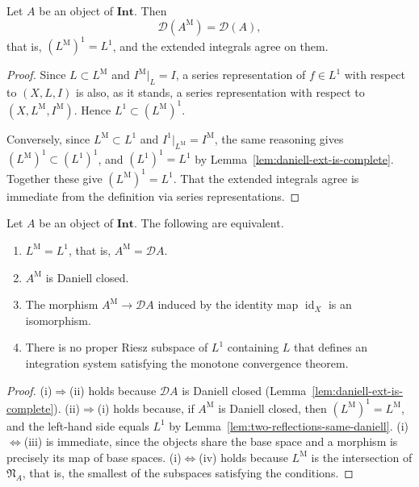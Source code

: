 \begin{lemma}\label{lem:two-reflections-same-daniell}
  Let $A$ be an object of $\mathbf{Int}$. Then
  \[
    \mathcal{D}(A^{\mathrm{M}})=\mathcal{D}(A),
  \]
  that is, $(L^{\mathrm{M}})^1=L^1$, and the extended integrals agree on them.
\end{lemma}
\begin{proof}
  Since $L\subset L^{\mathrm{M}}$ and $I^{\mathrm{M}}|_L=I$, a series
  representation of $f\in L^1$ with respect to $(X,L,I)$ is also, as it stands, a
  series representation with respect to
  $(X,L^{\mathrm{M}},I^{\mathrm{M}})$.
  Hence $L^1\subset(L^{\mathrm{M}})^1$.

  Conversely, since $L^{\mathrm{M}}\subset L^1$ and
  $I^1|_{L^{\mathrm{M}}}=I^{\mathrm{M}}$, the same reasoning gives
  $(L^{\mathrm{M}})^1\subset(L^1)^1$, and
  $(L^1)^1=L^1$ by Lemma~\ref{lem:daniell-ext-is-complete}.
  Together these give $(L^{\mathrm{M}})^1=L^1$.
  That the extended integrals agree is immediate from the definition via series
  representations.
\end{proof}

\begin{proposition}\label{prop:two-reflections-coincide}
  Let $A$ be an object of $\mathbf{Int}$. The following are equivalent.
  \begin{enumerate}
    \item[(i)] $L^{\mathrm{M}}=L^1$, that is, $A^{\mathrm{M}}=\mathcal{D}A$.
    \item[(ii)] $A^{\mathrm{M}}$ is Daniell closed.
    \item[(iii)] The morphism $A^{\mathrm{M}}\to\mathcal{D}A$ induced by the
      identity map $\operatorname{id}_X$ is an isomorphism.
    \item[(iv)] There is no proper Riesz subspace of $L^1$ containing $L$ that
      defines an integration system satisfying the monotone convergence theorem.
  \end{enumerate}
\end{proposition}
\begin{proof}
  (i)$\Rightarrow$(ii) holds because $\mathcal{D}A$ is Daniell closed
  (Lemma~\ref{lem:daniell-ext-is-complete}).
  (ii)$\Rightarrow$(i) holds because, if $A^{\mathrm{M}}$ is Daniell closed, then
  $(L^{\mathrm{M}})^1=L^{\mathrm{M}}$, and the left-hand side equals $L^1$ by
  Lemma~\ref{lem:two-reflections-same-daniell}.
  (i)$\Leftrightarrow$(iii) is immediate, since the objects share the base space
  and a morphism is precisely its map of base spaces.
  (i)$\Leftrightarrow$(iv) holds because $L^{\mathrm{M}}$ is the intersection of
  $\mathfrak{N}_A$, that is, the smallest of the subspaces satisfying the
  conditions.
\end{proof}


